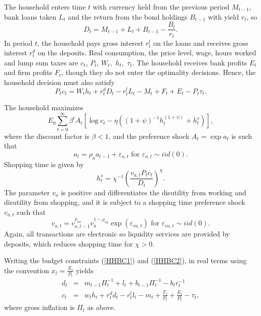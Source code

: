 \documentclass[]{article}
\begin{document}
The household enters time $t$ with currency held from
the previous period $M_{t-1}$, bank loans taken $L_{t}$ and the return from the bond holdings $B_{t-1}$ with yield $r_{t}$, so%
\begin{equation}
D_{t}=M_{t-1}+L_{t}+B_{t-1}-\frac{B_{t}}{r_{t}}.  \label{HHBC1}
\end{equation}%
In period $t$, the household pays gross interest $r_{t}^{l}$ on the loans and
receives gross interest $r_{t}^{d}$ on the deposits. Real consumption, the
price level, wage, hours worked and lump sum taxes are $c_{t}$, $P_{t}$, $%
W_{t},$ $h_{t},$ $\tau _{t}$. The household receives bank profits $E_{t}$ and firm profits $F_{t}$, though they do not enter the optimality decisions.
Hence, the household decision must also satisfy%
\begin{equation}
P_{t}c_{t}=W_{t}h_{t}+r_{t}^{d}D_{t}-r_{t}^{l}L_{t}-M_{t}+F_{t}+E_{t}-P_{t}%
\tau _{t}.  \label{HHBC2}
\end{equation}

The household maximizes%
\begin{equation}
E_{0}\sum\limits_{t=0}^{\infty } \beta ^{t} A_{t}\left[ \log{c}_{t}-\eta
\left( \left(1+\psi\right)^{-1}h_{t}^{\left(1+\psi\right)}+h_{t}^{s}\right) \right] ,  \label{U}
\end{equation}%
where the discount factor is $\beta <1$, and the preference shock $%
A_{t}=\exp a_{t}$ is such that%
\begin{equation}
a_{t}=\rho _{a}a_{t-1}+\varepsilon _{a,t} \text{ for }\varepsilon _{a,t}\sim
iid\left( 0\right).
\label{a}
\end{equation}
Shopping time is given by
\begin{equation}
h_{t}^{s}=\chi ^{-1}\left( \frac{v_{a,t}P_{t}c_{t}}{D_{t}}\right) ^{\chi }.
\label{hs}
\end{equation}%
The parameter $v_{a}$ is positive and differentiates the disutility from
working and disutility from shopping, and it is subject to a shopping time preference shock $v_{a,t}$ such that%
\begin{equation}
v_{a,t}=v_{a,t-1}^{\rho_{va}}v_{a}^{1-\rho_{va}}\exp(\varepsilon_{va,t}) \text{ for }\varepsilon_{va,t}\sim
iid\left( 0\right).
\label{va}
\end{equation}%
Again, all transactions are electronic so liquidity services
are provided by deposits, which reduces shopping time for $\chi>0$.

Writing the budget constraints (\ref{HHBC1}) and (\ref{HHBC2}), in real
terms using the convention $x_{t}=\frac{X_{t}}{P_{t}}$ yields%
\begin{eqnarray}
d_{t} &=&m_{t-1}\Pi_{t}^{-1}+l_{t}+b_{t-1}\Pi_{t}^{-1}-b_{t}r_{t}^{-1}  \label{realBC1} \\
c_{t} &=&w_{t}h_{t}+r_{t}^{d}d_{t}-r_{t}^{l}l_{t}-m_{t}+\frac{F_{t}}{P_{t}}+
\frac{E_{t}}{P_{t}}-\tau _{t}, \label{realBC2}
\end{eqnarray}%
where gross inflation is $\Pi _{t}$ as above. 
\end{document}
